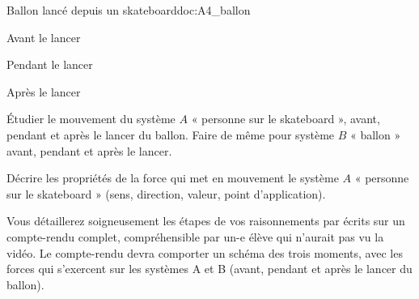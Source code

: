 \begin{doc}{Ballon lancé depuis un skateboard}{doc:A4_ballon}
  \begin{flushright}
    \vspace*{-18pt}
  \end{flushright}
  \begin{multicols}{3}
    \centering
    
    Avant le lancer
    

    Pendant le lancer
    

    Après le lancer
  \end{multicols}
\end{doc}



\numeroQuestion Étudier le mouvement du système $A$ « personne sur le skateboard », avant, pendant et après le lancer du ballon.
Faire de même pour système $B$ « ballon » avant, pendant et après le lancer.

\numeroQuestion Décrire les propriétés de la force qui met en mouvement le système $A$ « personne sur le skateboard » (sens, direction, valeur, point d'application).

\numeroQuestion Vous détaillerez soigneusement les étapes de vos raisonnements par écrits sur un compte-rendu complet, compréhensible par un-e élève qui n'aurait pas vu la vidéo.
Le compte-rendu devra comporter un schéma des trois moments, avec les forces qui s'exercent sur les systèmes A et B (avant, pendant et après le lancer du ballon).

